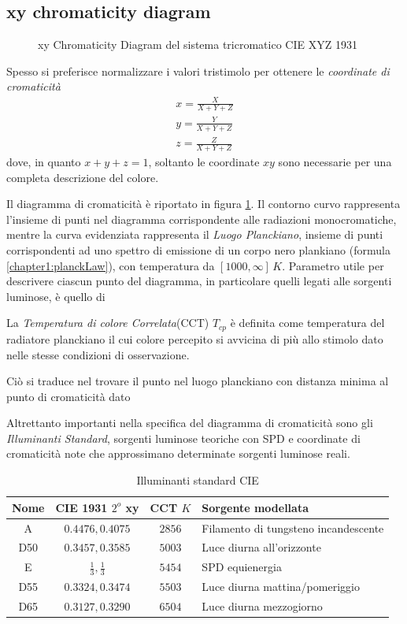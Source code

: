 \subsection{xy chromaticity diagram}
\begin{figure}[tb]
	
	\label{chapter2:colorimetry:cromaticityDiagram}
	\caption{xy Chromaticity Diagram del sistema tricromatico CIE XYZ 1931}
\end{figure}
Spesso si preferisce normalizzare i valori tristimolo per ottenere le \textit{coordinate di cromaticit\`a}
\begin{align}
	x = \frac{X}{X+Y+Z}\\
	y = \frac{Y}{X+Y+Z}\\
	z = \frac{Z}{X+Y+Z}
\end{align}
dove, in quanto $x+y+z=1$, soltanto le coordinate $xy$ sono necessarie per una completa descrizione del colore.\par
Il diagramma di cromaticit\`a \`e riportato in figura \ref{chapter2:colorimetry:cromaticityDiagram}. Il contorno curvo rappresenta l'insieme di punti
nel diagramma corrispondente alle radiazioni monocromatiche, mentre la curva evidenziata rappresenta il \textit{Luogo Planckiano}, insieme di punti
corrispondenti ad uno spettro di emissione di un corpo nero plankiano (formula \ref{chapter1:planckLaw}), con temperatura da $[1000,\infty]\,\si{K}$.
Parametro utile per descrivere ciascun punto del diagramma, in particolare quelli legati alle sorgenti luminose, \`e quello di
\begin{definitionS}
	La \textit{Temperatura di colore Correlata}(CCT) $T_{cp}$ \`e definita come temperatura del radiatore planckiano il cui colore percepito si
	avvicina di pi\`u allo stimolo dato nelle stesse condizioni di osservazione.\par
	Ci\`o si traduce nel trovare il punto nel luogo planckiano con distanza minima al punto di cromaticit\`a dato
\end{definitionS}
Altrettanto importanti nella specifica del diagramma di cromaticit\`a sono gli \textit{Illuminanti Standard}, sorgenti luminose teoriche con SPD e 
coordinate di cromaticit\`a note che approssimano determinate sorgenti luminose reali.
\begin{table}
	\begin{tabularx}{\linewidth}{cccY}
		\toprule
		Nome & CIE 1931 $2^o$ xy & CCT $\si{K}$ & Sorgente modellata\\
		\midrule
		A & $0.4476, 0.4075$ & $2856$ & Filamento di tungsteno incandescente\\
		D50 & $0.3457, 0.3585$ & $5003$ & Luce diurna all'orizzonte\\
		E & $\frac{1}{3}, \frac{1}{3}$ & $5454$ & SPD equienergia \\
		D55 & $0.3324, 0.3474$ & $5503$ & Luce diurna mattina/pomeriggio \\
		D65 & $0.3127, 0.3290$ & $6504$ & Luce diurna mezzogiorno\\
		\bottomrule
	\end{tabularx}
	\caption{Illuminanti standard CIE}
\end{table}
